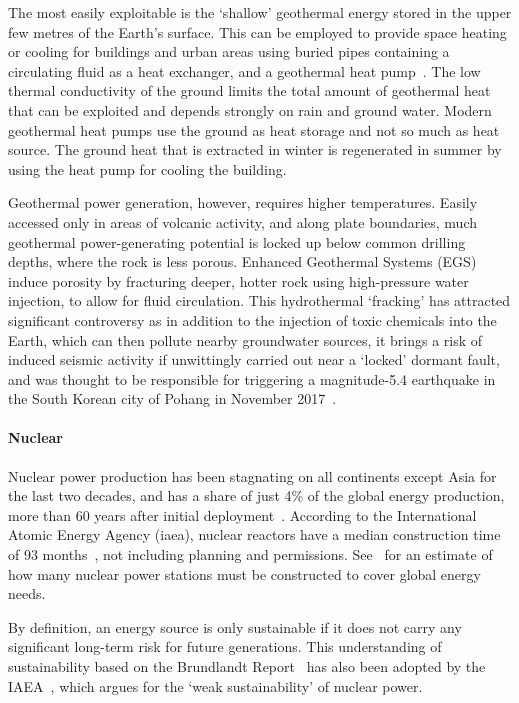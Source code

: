 \documentclass[../SustainableHEP.tex]{subfiles}
\begin{document}
The most easily exploitable is the `shallow' geothermal energy stored in the upper few metres of the Earth's surface.  This can be employed to provide space heating or cooling for buildings and urban areas using buried pipes containing a circulating fluid as a heat exchanger, and a geothermal heat pump~\cite{Narsilio2018}. The low thermal conductivity of the ground limits the total amount of geothermal heat that can be exploited and depends strongly on rain and ground water. Modern geothermal heat pumps use the ground as heat storage and not so much as heat source. The ground heat that is extracted in winter is regenerated in summer by using the heat pump for cooling the building.  

Geothermal power generation, however, requires higher temperatures.  Easily accessed only in areas of volcanic activity, and along plate boundaries, much geothermal power-generating potential is locked up below common drilling depths, where the rock is less porous.  Enhanced Geothermal Systems (EGS)~\cite{IRENA2017} induce porosity by fracturing deeper, hotter rock using high-pressure water injection, to allow for fluid circulation.  This hydrothermal `fracking' has attracted significant controversy as in addition to the injection of toxic chemicals into the Earth, which can then pollute nearby groundwater sources, it brings a risk of induced seismic activity if unwittingly carried out near a `locked' dormant fault, and was thought to be responsible for triggering a magnitude-5.4 earthquake in the South Korean city of Pohang in November 2017~\cite{Kim2018,Grigoli2018}. 

\paragraph{Nuclear}

Nuclear power production has been stagnating on all continents except Asia for the last two decades, and has a share of just 4\% of the global energy production, more than 60 years after initial deployment~\cite{OWDnuclear}. According to the International Atomic Energy Agency (\acrshort{iaea}), nuclear reactors have a median construction time of 93 months~\cite{IAEANuclear}, not including planning and permissions.  See~ for an estimate of how many nuclear power stations must be constructed to cover global energy needs. 
 
By definition, an energy source is only sustainable if it does not carry any significant long-term risk for future generations. This understanding of sustainability based on the Brundlandt Report~\cite{Brundtland} has also been adopted by the IAEA~\cite{IAEA}, which argues for the `weak sustainability' of nuclear power.
\end{document}
